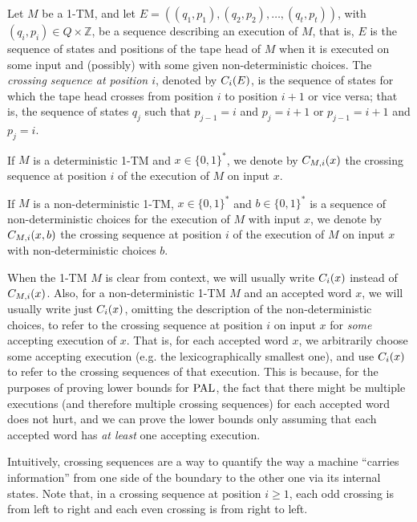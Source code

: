 \begin{definition}
Let $M$ be a 1-TM, and let $E = ((q_1, p_1), (q_2, p_2), \dots, (q_t, p_t))$, 
with $(q_i, p_i) \in Q \times \mathbb{Z}$, be a sequence describing an execution of
$M$, that is, $E$ is the sequence of states and positions of the tape head of $M$ when
it is executed on some input and (possibly) with some given non-deterministic choices.
The \emph{crossing sequence at position $i$}, denoted by $C_i(E)$,
is the sequence of states for 
which the tape head crosses from position $i$ to position $i+1$ or vice versa; that is, the
sequence of states $q_j$
such that $p_{j-1} = i$ and $p_{j} = i+1$ or $p_{j-1} = i+1$ and $p_j = i$. 

If $M$ is a deterministic 1-TM and $x \in \{0, 1\}^*$, we denote by $C_{M,i}(x)$ 
the crossing sequence at position $i$ of the execution of $M$ on input $x$. 

If $M$ is a non-deterministic 1-TM, $x \in \{0, 1\}^*$ and $b \in \{0, 1\}^*$ is a 
sequence of non-deterministic choices for the execution of $M$ with input $x$,
we denote by $C_{M,i}(x, b)$ the crossing sequence at position $i$ of the execution of $M$ on
input $x$ with non-deterministic choices $b$.

\end{definition}


When the 1-TM $M$ is clear from context, we will usually write $C_i(x)$ instead of $C_{M,i}(x)$.
Also, for a non-deterministic 1-TM $M$ and an accepted word $x$, 
we will usually write just $C_i(x)$, omitting the description of 
the non-deterministic choices, to refer to the crossing sequence at position $i$ on input $x$
for \emph{some} accepting execution of $x$. That is, for each accepted word $x$, we arbitrarily choose
some accepting execution (e.g. the lexicographically smallest one), and use $C_i(x)$ to refer to the
crossing sequences of that execution. This is because, for the purposes of proving lower bounds for $\mathrm{PAL}$,
the fact that there might be multiple executions (and therefore multiple crossing sequences) for each accepted
word does not hurt, and we can prove the lower bounds only assuming that each accepted word has \emph{at least}
one accepting execution.

Intuitively, crossing sequences are a way to quantify the way a machine ``carries information'' from one
side of the boundary to the other one via its internal states. Note that, in a crossing sequence at position
$i \geq 1$, each odd crossing is from left to right
and each even crossing is from right to left. 

